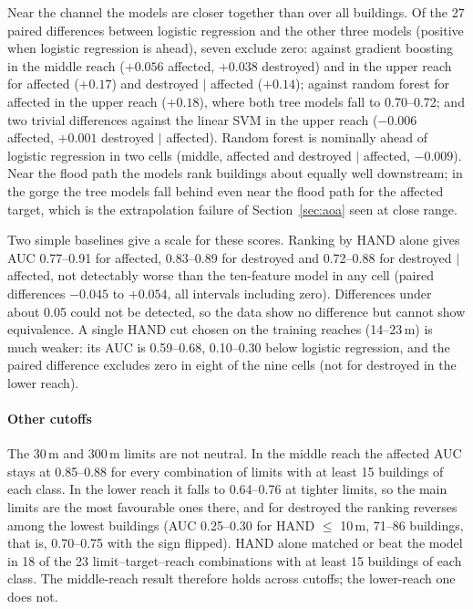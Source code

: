 \documentclass[journal,a4paper]{IEEEtran}
\begin{document}
Near the channel the models are closer together than over all buildings. Of the 27 paired differences between logistic regression and the other three models (positive when logistic regression is ahead), seven exclude zero: against gradient boosting in the middle reach ($+0.056$ affected, $+0.038$ destroyed) and in the upper reach for affected ($+0.17$) and destroyed $\mid$ affected ($+0.14$); against random forest for affected in the upper reach ($+0.18$), where both tree models fall to 0.70--0.72; and two trivial differences against the linear SVM in the upper reach ($-0.006$ affected, $+0.001$ destroyed $\mid$ affected). Random forest is nominally ahead of logistic regression in two cells (middle, affected and destroyed $\mid$ affected, $-0.009$). Near the flood path the models rank buildings about equally well downstream; in the gorge the tree models fall behind even near the flood path for the affected target, which is the extrapolation failure of Section~\ref{sec:aoa} seen at close range.

Two simple baselines give a scale for these scores. Ranking by HAND alone gives AUC 0.77--0.91 for affected, 0.83--0.89 for destroyed and 0.72--0.88 for destroyed $\mid$ affected, not detectably worse than the ten-feature model in any cell (paired differences $-0.045$ to $+0.054$, all intervals including zero). Differences under about 0.05 could not be detected, so the data show no difference but cannot show equivalence. A single HAND cut chosen on the training reaches (14--23\,m) is much weaker: its AUC is 0.59--0.68, 0.10--0.30 below logistic regression, and the paired difference excludes zero in eight of the nine cells (not for destroyed in the lower reach).

\paragraph{Other cutoffs} The 30\,m and 300\,m limits are not neutral. In the middle reach the affected AUC stays at 0.85--0.88 for every combination of limits with at least 15 buildings of each class. In the lower reach it falls to 0.64--0.76 at tighter limits, so the main limits are the most favourable ones there, and for destroyed the ranking reverses among the lowest buildings (AUC 0.25--0.30 for HAND $\leq$ 10\,m, 71--86 buildings, that is, 0.70--0.75 with the sign flipped). HAND alone matched or beat the model in 18 of the 23 limit--target--reach combinations with at least 15 buildings of each class. The middle-reach result therefore holds across cutoffs; the lower-reach one does not.
\end{document}

